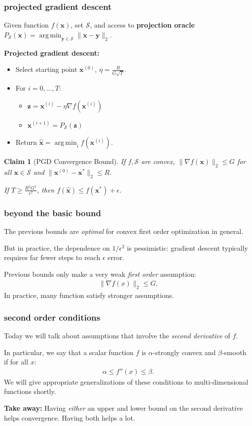 \documentclass[compress]{beamer}
\newcommand{\bv}[1]{\mathbf{#1}}
\DeclareMathOperator*{\argmin}{arg\,min}
\newtheorem{claim}[theorem]{Claim}
\begin{document}
\begin{frame}[t]
	\frametitle{projected gradient descent}
	Given function $f(\bv{x})$, set $\mathcal{S}$, and access to \textbf{\alert{projection oracle}} $P_{\mathcal{S}}(\bv{x}) = \argmin_{\bv{y}\in \mathcal{S}} \|\bv{x} - \bv{y}\|_2$. 
	
	\textbf{Projected gradient descent:}
	\begin{itemize}
		\item Select starting point $\bv{x}^{(0)}$, $\eta = \frac{R}{G\sqrt{T}}$. 
		\item For $i = 0,\ldots, T$:
		\begin{itemize}
			\item $\bv{z} = \bv{x}^{(i)} - \eta \nabla f(\bv{x}^{(i)})$
			\item $\bv{x}^{(i+1)} = P_\mathcal{S}(\bv{z})$
		\end{itemize}
		\item Return $\hat{\bv{x}} = \argmin_{i} f(\bv{x}^{(i)})$.
	\end{itemize}
	
	
	
	
\begin{claim}[PGD Convergence Bound]
	If $f, \mathcal{S}$ are convex, $\|\nabla f(\bv{x})\|_2 \leq G$ for all $\bv{x}\in \mathcal{S}$ and $\|\bv{x}^{(0)} - \bv{x}^*\|_2 \leq R$. 
	
	If $T \geq \frac{R^2G^2}{\epsilon^2}$, then $f(\hat{\bv{x}}) \leq f(\bv{x}^*) + \epsilon$.
\end{claim}
\end{frame}

\begin{frame}
	\frametitle{beyond the basic bound}
	The previous bounds are \emph{optimal} for convex first order optimization in general. 
	
	But in practice, the dependence on $1/\epsilon^2$ is  pessimistic: gradient descent typically requires far fewer steps to reach $\epsilon$ error. 

	Previous bounds only make a very weak \emph{first order} assumption: 
	\begin{align*}
		\|\nabla f(x)\|_2 \leq G.
	\end{align*}
	In practice, many function satisfy stronger assumptions. 
\end{frame}

\begin{frame}
	\frametitle{second order conditions}
	Today we will talk about assumptions that involve the \emph{second derivative} of $f$. 
	
	In particular, we say that a scalar function $f$ is \alert{$\alpha$-strongly convex} and \alert{$\beta$-smooth} if for all $x$:
	\begin{align*}
		\alpha \leq f''(x) \leq \beta.
	\end{align*}
\alert{We will give appropriate generalizations of these conditions to multi-dimensional functions shortly.}

	\textbf{Take away:} Having \emph{either} an upper and lower bound on the second derivative helps convergence. Having both helps a lot.
\end{frame}
\end{document}
